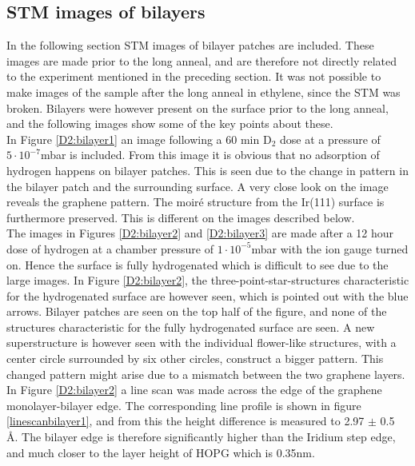 \subsection{STM images of bilayers}

In the following section STM images of bilayer patches are included. These images are made prior to the long anneal, and are therefore not directly related to the experiment mentioned in the preceding section. It was not possible to make images of the sample after the long anneal in ethylene, since the STM was broken. Bilayers were however present on the surface prior to the long anneal, and the following images show some of the key points about these.\\
In Figure \ref{D2:bilayer1} an image following a 60 min D$_2$ dose at a pressure of $5\cdot 10^{-7}$mbar is included. From this image it is obvious that no adsorption of hydrogen happens on bilayer patches. This is seen due to the change in pattern in the bilayer patch and the surrounding surface. A very close look on the image reveals the graphene pattern. The moiré structure from the Ir(111) surface is furthermore preserved. This is different on the images described below.\\
The images in Figures \ref{D2:bilayer2} and \ref{D2:bilayer3} are made after a 12 hour dose of hydrogen at a chamber pressure of $1\cdot 10^{-5}$mbar with the ion gauge turned on. Hence the surface is fully hydrogenated which is difficult to see due to the large images. In Figure \ref{D2:bilayer2}, the three-point-star-structures characteristic for the hydrogenated surface are however seen, which is pointed out with the blue arrows. Bilayer patches are seen on the top half of the figure, and none of the structures characteristic for the fully hydrogenated surface are seen. A new superstructure is however seen with the individual flower-like structures, with a center circle surrounded by six other circles, construct a bigger pattern. This changed pattern might arise due to a mismatch between the two graphene layers.\\
In Figure \ref{D2:bilayer2} a line scan was made across the edge of the graphene monolayer-bilayer edge. The corresponding line profile is shown in figure \ref{linescanbilayer1}, and from this the height difference is measured to 2.97 $\pm$ 0.5 Å. The bilayer edge is therefore significantly higher than the Iridium step edge, and much closer to the layer height of HOPG which is 0.35nm.\cite{PhysRevB.79.195429}\\
